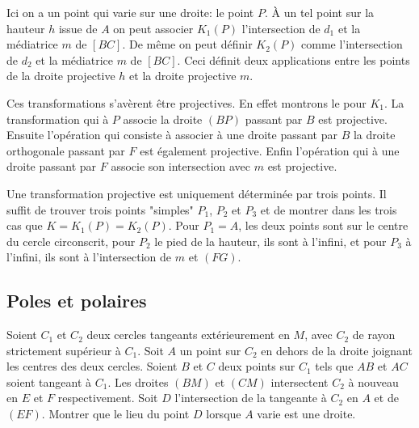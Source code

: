 \begin{sol}
Ici on a un point qui varie sur une droite: le point $P$. À un tel point sur la hauteur $h$ issue de $A$ on peut associer $K_1(P)$ l'intersection de $d_1$ et la médiatrice $m$ de $[BC]$. De même on peut définir $K_2(P)$ comme l'intersection de $d_2$ et la médiatrice $m$ de $[BC]$. Ceci définit deux applications entre les points de la droite projective $h$ et la droite projective $m$. 

\medskip

Ces transformations s'avèrent être projectives. En effet montrons le pour $K_1$. La transformation qui à $P$ associe la droite $(BP)$ passant par $B$ est projective. Ensuite l'opération qui consiste à associer à une droite passant par $B$ la droite orthogonale passant par $F$ est également projective. Enfin l'opération qui à une droite passant par $F$ associe son intersection avec $m$ est projective.

\medskip

Une transformation projective est uniquement déterminée par trois points. Il suffit de trouver trois points "simples" $P_1$, $P_2$ et $P_3$ et de montrer dans les trois cas que $K=K_1(P)=K_2(P)$. Pour $P_1=A$, les deux points sont sur le centre du cercle circonscrit, pour $P_2$ le pied de la hauteur, ils sont à l'infini, et pour $P_3$ à l'infini, ils sont à l'intersection de $m$ et $(FG)$.

\end{sol}


\subsection*{Poles et polaires}

\begin{exo}

Soient $C_1$ et $C_2$ deux cercles tangeants extérieurement en $M$, avec $C_2$ de rayon strictement supérieur à $C_1$. Soit $A$ un point sur $C_2$ en dehors de la droite joignant les centres des deux cercles. Soient $B$ et $C$ deux points sur $C_1$ tels que $AB$ et $AC$ soient tangeant à $C_1$. Les droites $(BM)$ et $(CM)$ intersectent $C_2$ à nouveau en $E$ et $F$ respectivement. Soit $D$ l'intersection de la tangeante à $C_2$ en $A$ et de $(EF)$. Montrer que le lieu du point $D$ lorsque $A$ varie est une droite.

\end{exo}

